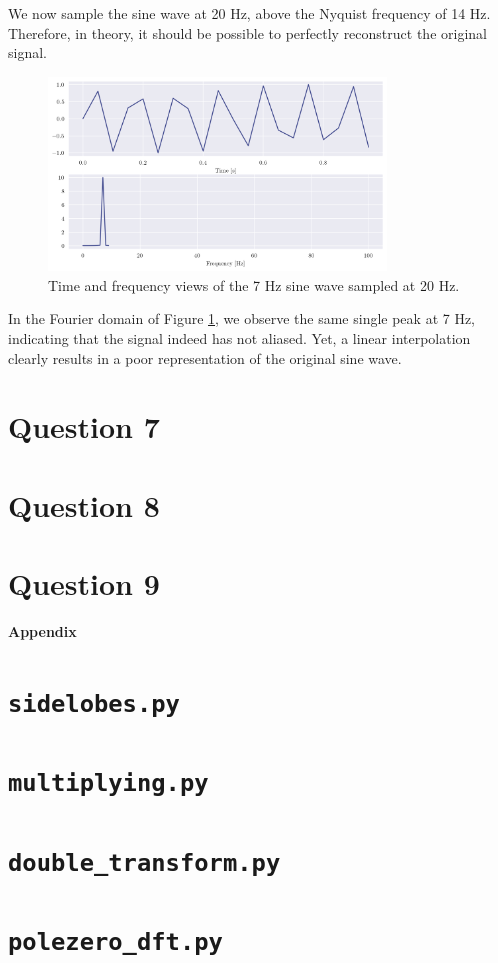 \documentclass[a4paper, 11pt]{article}
\begin{document}
We now sample the sine wave at 20 Hz, above the Nyquist frequency of 14 Hz.
Therefore, in theory, it should be possible to perfectly reconstruct the
original signal.
\begin{figure}[ht]
    \centering
    \includegraphics[width=0.8\textwidth]{images/q6_sampled.png}
    \caption{Time and frequency views of the 7 Hz sine wave sampled at 20 Hz.}
    \label{fig:q6_sampled}
\end{figure}

In the Fourier domain of Figure \ref{fig:q6_sampled}, we observe the same single
peak at 7 Hz, indicating that the signal indeed has not aliased. Yet, a linear
interpolation clearly results in a poor representation of the original sine wave.

\newpage



\newpage
\section*{Question 7}
\section*{Question 8}
\section*{Question 9}

\newpage
\appendix
\begin{center}
    \LARGE{\textbf{Appendix}}
\end{center}

\section{\texttt{sidelobes.py}}


\newpage
\section{\texttt{multiplying.py}}


\newpage
\section{\texttt{double\_transform.py}}


\newpage
\section{\texttt{polezero\_dft.py}}

\end{document}

